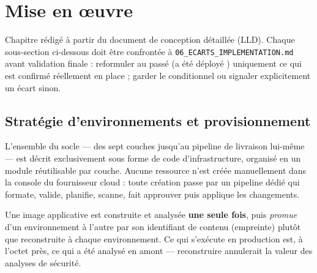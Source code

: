 \chapter{Mise en œuvre}
\label{ch:mise-en-oeuvre}

\begin{attentedoc}
Chapitre rédigé à partir du document de conception détaillée (LLD). Chaque sous-section
ci-dessous doit être confrontée à \texttt{06\_ECARTS\_IMPLEMENTATION.md} avant validation
finale : reformuler au passé (\og a été déployé \fg{}) uniquement ce qui est confirmé
réellement en place ; garder le conditionnel ou signaler explicitement un écart sinon.
\end{attentedoc}

\section{Stratégie d'environnements et provisionnement}

L'ensemble du socle --- des sept couches jusqu'au pipeline de livraison lui-même --- est
décrit exclusivement sous forme de code d'infrastructure, organisé en un module réutilisable
par couche. Aucune ressource n'est créée manuellement dans la console du fournisseur cloud :
toute création passe par un pipeline dédié qui formate, valide, planifie, scanne, fait
approuver puis applique les changements.

\begin{keybox}[title=Principe retenu]
Une image applicative est construite et analysée \textbf{une seule fois}, puis
\emph{promue} d'un environnement à l'autre par son identifiant de contenu (empreinte)
plutôt que reconstruite à chaque environnement. Ce qui s'exécute en production est, à
l'octet près, ce qui a été analysé en amont --- reconstruire annulerait la valeur des
analyses de sécurité.
\end{keybox}


